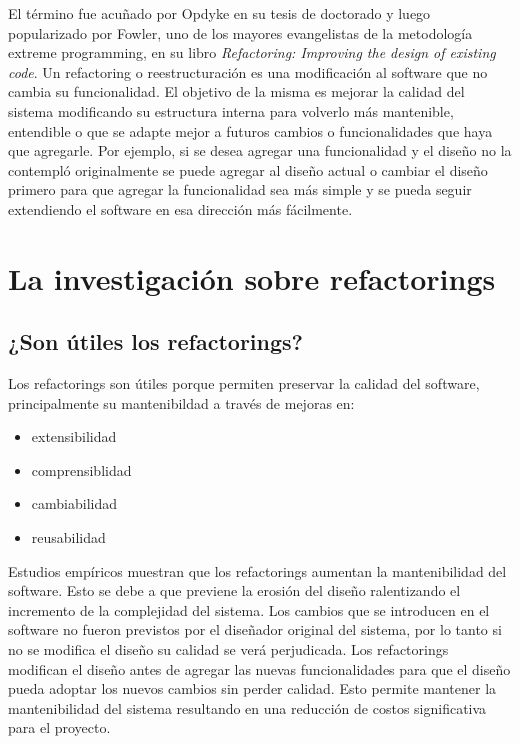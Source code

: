 El término fue acuñado por Opdyke en su tesis de doctorado y luego popularizado por Fowler, uno de
los mayores evangelistas de la metodología extreme programming, en su libro \textit{Refactoring:
Improving the design of existing code}. Un refactoring o reestructuración es una modificación al
software que no cambia su funcionalidad. El objetivo de la misma es mejorar la calidad del sistema
modificando su estructura interna para volverlo más mantenible, entendible o que se adapte mejor a
futuros cambios o funcionalidades que haya que agregarle. Por ejemplo, si se desea agregar una
funcionalidad y el diseño no la contempló originalmente se puede agregar al diseño actual o cambiar
el diseño primero para que agregar la funcionalidad sea más simple y se pueda seguir extendiendo el
software en esa dirección más fácilmente.



\section{La investigación sobre refactorings}

\subsection{¿Son útiles los refactorings?}
Los refactorings son útiles porque permiten preservar la calidad del software, principalmente su 
mantenibildad a través de mejoras en:

\begin{itemize}
    \item extensibilidad
    \item comprensiblidad
    \item cambiabilidad
    \item reusabilidad
\end{itemize}

Estudios empíricos muestran que los refactorings aumentan la mantenibilidad del software. Esto se
debe a que previene la erosión del diseño ralentizando el incremento de la complejidad del sistema.
Los cambios que se introducen en el software no fueron previstos por el diseñador original del
sistema, por lo tanto si no se modifica el diseño su calidad se verá perjudicada. Los refactorings
modifican el diseño antes de agregar las nuevas funcionalidades para que el diseño pueda adoptar los
nuevos cambios sin perder calidad. Esto permite mantener la mantenibilidad del sistema resultando
en una reducción de costos significativa para el proyecto.


